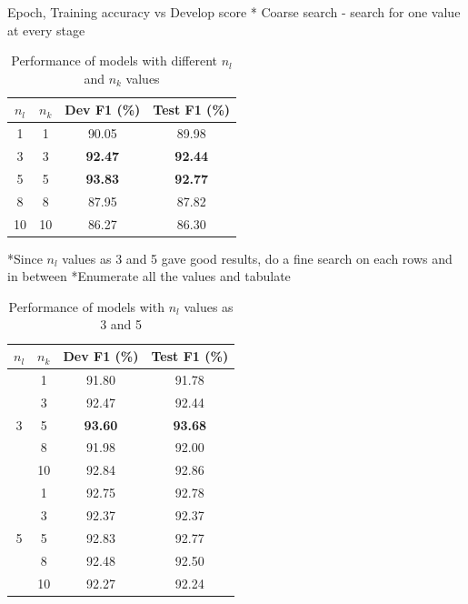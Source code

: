 \documentclass[a4paper, 11pt]{article}
\begin{document}
Epoch, Training accuracy vs Develop score
* Coarse search - search for one value at every stage

\begin{table}[h!]
  \begin{center}
    \label{tab:table1}
    \def\arraystretch{1.5}%
    \begin{tabular}{c|c|c|c}
      \textbf{$n_l$} & \textbf{$n_k$} & Dev F1 (\%) & Test F1 (\%) \\
      \hline
      1 & 1 & 90.05 & 89.98\\
      3 & 3 & \textbf{92.47} & \textbf{92.44}\\
      5 & 5 & \textbf{93.83} & \textbf{92.77}\\
      8 & 8 & 87.95 & 87.82\\
      10 & 10 & 86.27 & 86.30\\
    \end{tabular}
    \caption{Performance of models with different $n_l$ and $n_k$ values}
  \end{center}
\end{table}

*Since $n_l$ values as 3 and 5 gave good results, do a fine search on each rows and in between
*Enumerate all the values and tabulate

\begin{table}[h!]
  \begin{center}
  \def\arraystretch{1.5}%

    \label{tab:table1}
    \begin{tabular}{c|c|c|c}
      \textbf{$n_l$} & \textbf{$n_k$} & Dev F1 (\%) & Test F1 (\%) \\
      \hline
      \multirow{5}{*}{3} & 1 & 91.80 & 91.78\\
	  & 3 & 92.47 & 92.44\\
	  & 5 & \textbf{93.60} & \textbf{93.68}\\
	  & 8 & 91.98 & 92.00\\
	  & 10 & 92.84 & 92.86\\
	  \hline
      \multirow{5}{*}{5} & 1 & 92.75 & 92.78\\
	  & 3 & 92.37 & 92.37\\
	  & 5 & 92.83 & 92.77\\
	  & 8 & 92.48 & 92.50\\
	  & 10 & 92.27 & 92.24\\
    \end{tabular}
    \caption{Performance of models with $n_l$ values as 3 and 5}
  \end{center}
\end{table}
\end{document}
